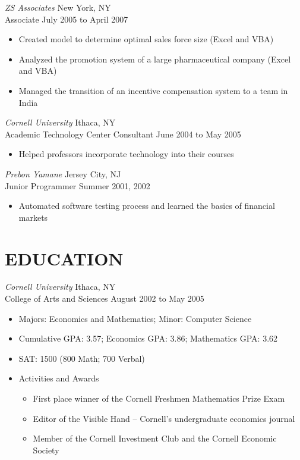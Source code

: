 \documentclass{res}
\begin{document}
\begin{resume}
{\sl ZS Associates} \hfill New York, NY \\
Associate \hfill July 2005 to April 2007
 \begin{itemize} \itemsep -2pt
  \item Created model to determine optimal sales force size (Excel and VBA)
  \item Analyzed the promotion system of a large pharmaceutical company (Excel and VBA)
  \item Managed the transition of an incentive compensation system to a team in India
\end{itemize} \vspace{-6pt}

{\sl Cornell University} \hfill Ithaca, NY \\
Academic Technology Center Consultant \hfill June 2004 to May 2005
 \begin{itemize} \itemsep -2pt
  \item Helped professors incorporate technology into their courses
\end{itemize} \vspace{-6pt}

{\sl Prebon Yamane} \hfill Jersey City, NJ \\
Junior Programmer \hfill Summer 2001, 2002
 \begin{itemize} \itemsep -2pt
  \item Automated software testing process and learned the basics of financial markets
\end{itemize} \vspace{-8pt}
 
\section{EDUCATION}
\vspace{1pt}
{\sl Cornell University} \hfill Ithaca, NY \\
College of Arts and Sciences \hfill August 2002 to May 2005
 \begin{itemize} \itemsep -2pt
  \item Majors: Economics and Mathematics; Minor: Computer Science
  \item Cumulative GPA: 3.57; Economics GPA: 3.86; Mathematics GPA: 3.62
  \item SAT: 1500 (800 Math; 700 Verbal)
  \item Activities and Awards \vspace{-6pt}
    \begin{itemize} \itemsep -1pt
    \item First place winner of the Cornell Freshmen Mathematics Prize Exam
    \item Editor of the Visible Hand – Cornell’s undergraduate economics journal
    \item Member of the Cornell Investment Club and the Cornell Economic Society
    \end{itemize} \vspace{0px}
\end{itemize} \vspace{-8pt}


\end{resume}
\end{document}
